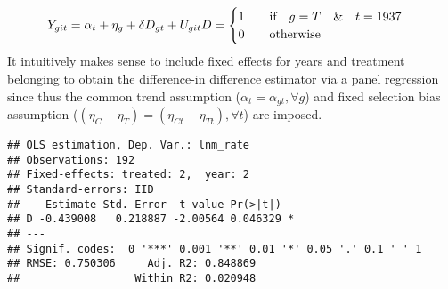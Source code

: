\documentclass[
]{article}
\newenvironment{Shaded}{\begin{snugshade}}{\end{snugshade}}
\newcommand{\AttributeTok}[1]{\textcolor[rgb]{0.77,0.63,0.00}{#1}}
\newcommand{\DecValTok}[1]{\textcolor[rgb]{0.00,0.00,0.81}{#1}}
\newcommand{\FunctionTok}[1]{\textcolor[rgb]{0.00,0.00,0.00}{#1}}
\newcommand{\NormalTok}[1]{#1}
\newcommand{\OtherTok}[1]{\textcolor[rgb]{0.56,0.35,0.01}{#1}}
\newcommand{\SpecialCharTok}[1]{\textcolor[rgb]{0.00,0.00,0.00}{#1}}
\newcommand{\StringTok}[1]{\textcolor[rgb]{0.31,0.60,0.02}{#1}}
\begin{document}
\[
Y_{git}=\alpha_t+\eta_g+\delta D_{gt}+U_{git}\\
D=\begin{cases} 1 \qquad \text{if} \quad g=T \quad \& \quad t=1937 \\0 \qquad \text{otherwise} \end{cases}
\] It intuitively makes sense to include fixed effects for years and
treatment belonging to obtain the difference-in difference estimator via
a panel regression since thus the common trend assumption
(\(\alpha_t=\alpha_{gt}, \forall g\)) and fixed selection bias
assumption (\((\eta_C-\eta_T)=(\eta_{Ct}-\eta_{Tt}),\forall t\)) are
imposed.

\begin{Shaded}
\end{Shaded}

\begin{Shaded}
\end{Shaded}

\begin{verbatim}
## OLS estimation, Dep. Var.: lnm_rate
## Observations: 192 
## Fixed-effects: treated: 2,  year: 2
## Standard-errors: IID 
##    Estimate Std. Error  t value Pr(>|t|)    
## D -0.439008   0.218887 -2.00564 0.046329 *  
## ---
## Signif. codes:  0 '***' 0.001 '**' 0.01 '*' 0.05 '.' 0.1 ' ' 1
## RMSE: 0.750306     Adj. R2: 0.848869
##                  Within R2: 0.020948
\end{verbatim}
\end{document}
